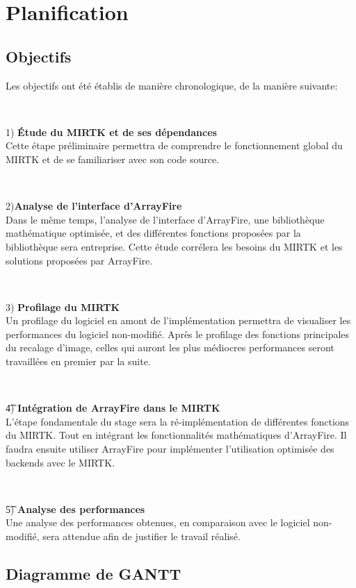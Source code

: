\documentclass[10pt]{report}
\begin{document}
	\section{Planification}
	\subsection{Objectifs} 
	Les objectifs ont été établis de manière chronologique, de la manière suivante: 
	~\par~\par 
	1) \textbf{Étude du MIRTK et de ses dépendances} \\
	Cette étape préliminaire permettra de comprendre le fonctionnement global du MIRTK et de se familiariser avec son code source. 
	~\par~\par 
	2)\textbf{Analyse de l'interface d'ArrayFire} \\
	Dans le même temps, l'analyse de l'interface d'ArrayFire, une bibliothèque mathématique optimisée, et des différentes fonctions proposées par la bibliothèque sera entreprise. Cette étude corrélera les besoins du MIRTK et les solutions proposées par ArrayFire.
	~\par~\par 
	3) \textbf{Profilage du MIRTK}\\
	Un profilage du logiciel en amont de l'implémentation permettra de visualiser les performances du logiciel non-modifié.	
	Après le profilage des fonctions principales du recalage d'image, celles qui auront les plus médiocres performances seront travaillées en premier par la suite.
	~\par~\par 
	\t 4) \textbf{Intégration de ArrayFire dans le MIRTK} \\
	L'étape fondamentale du stage sera la ré-implémentation de différentes fonctions du MIRTK. Tout en intégrant les fonctionnalités mathématiques d'ArrayFire. Il faudra ensuite utiliser ArrayFire pour implémenter l'utilisation optimisée des backends avec le MIRTK.
	~\par~\par 
	\t 5) \textbf{Analyse des performances} \\
	Une analyse des performances obtenues, en comparaison avec le logiciel non-modifié, sera attendue afin de justifier le travail réalisé.

	\subsection{Diagramme de GANTT}
\end{document}
